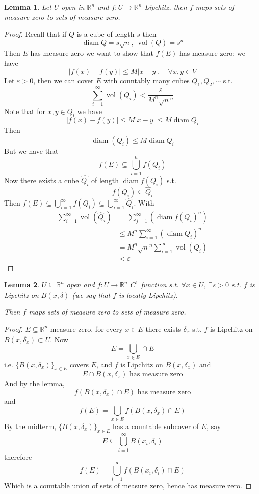 \documentclass[11pt,openany]{book}
\theoremstyle{plain}
\newtheorem{lemma}{Lemma}[chapter]
\theoremstyle{definition}
\theoremstyle{remark}
\newcommand{\R}{\mathbb{R}}
\newcommand{\set}[1]{\{ #1 \}}
\newcommand{\vol}{\operatorname{vol}}
\newcommand{\abs}[1]{\lvert #1 \rvert}
\begin{document}
\begin{lemma}
    Let $U$ open in $\R^n$ and $f \colon U \to \R^n$ Lipchitz, then $f$ maps sets of measure zero to sets of 
    measure zero.  
\end{lemma}

\begin{proof}
    Recall that if $Q$ is a cube of length $s$ then 
    $$\operatorname{diam} Q = s \sqrt{n}, \ \vol (Q) = s^n$$
    Then $E$ has measure zero we want to show that $f(E)$ has measure zero; we have 
    $$\abs{f(x)-f(y)} \le M \abs{x-y}, \quad \forall x, y \in V$$
    Let $\varepsilon > 0$, then we can cover $E$ with countably many cubes $Q_1, Q_2, \cdots$ s.t. 
    $$\sum_{i=1}^\infty \vol (Q_i) < \frac{\varepsilon}{M^n \sqrt{n}^n}$$
    Note that for $x,y \in Q_i$ we have 
    $$\abs{f(x) - f(y)} \le M \abs{x-y} \le M \operatorname{diam} Q_i$$
    Then 
    $$\operatorname{diam} (Q_i) \le M \operatorname{diam} Q_i$$
    But we have that 
    $$f(E) \subseteq \bigcup_{i=1}^n f(Q_i)$$
    Now there exists a cube $\hat{Q_i}$ of length $\operatorname{diam} f(Q_i)$ s.t. 
    $$f(Q_i) \subseteq \hat{Q}_i$$
    Then $f(E) \subseteq \bigcup_{i=1}^\infty f(Q_i) \subseteq \bigcup_{i=1}^\infty \hat{Q}_i$. 
    With 
    \begin{align*}
        \sum_{i=1}^\infty \vol (\hat{Q}_i) &= \sum_{j=1}^\infty \left(\operatorname{diam} f(Q_i)^n\right) \\
        &\le M^n \sum_{i=1}^\infty (\operatorname{diam} Q_i)^n \\
        &= M^n \sqrt{n}^n \sum_{i=1}^\infty \vol(Q_i) \\
        &< \varepsilon
    \end{align*}
\end{proof}

\begin{lemma}
    $U \subseteq \R^n$ open and $f \colon U \to \R^n$ $C^1$ function s.t. $\forall x \in U$, $\exists s > 0$ s.t. 
    $f$ is Lipchitz on $B(x, \delta)$ (we say that $f$ is locally Lipchitz).

    Then $f$ maps sets of measure zero to sets of measure zero. 
\end{lemma}

\begin{proof}
    $E \subseteq \R^n$ measure zero, for every $x \in E$ there exists $\delta_x$ s.t. 
    $f$ is Lipchitz on $B(x, \delta_x) \subset U$. Now 
    $$E = \bigcup_{x \in E} \cap E$$
    i.e. $\set{B(x,\delta_x)}_{x \in E}$ covers $E$, and $f$ is Lipchitz on $B(x, \delta_x)$ and 
    $$E \cap B(x, \delta_x) \text{ has measure zero}$$
    And by the lemma, 
    $$f(B(x,\delta_x) \cap E) \text{ has measure zero}$$
    and 
    $$f(E) = \bigcup_{x \in E} f\left(B(x, \delta_x) \cap E\right)$$
    By the midterm, $\set{B(x, \delta_x)}_{x \in E}$ has a countable subcover of $E$, say 
    $$E \subseteq  \bigcup_{i=1}^\infty B(x_i, \delta_i)$$
    therefore 
    $$f(E) = \bigcup_{i=1}^\infty f\left(B(x_i, \delta_i) \cap E\right)$$
    Which is a countable union of sets of measure zero, hence has measure zero. 
\end{proof}
\end{document}
